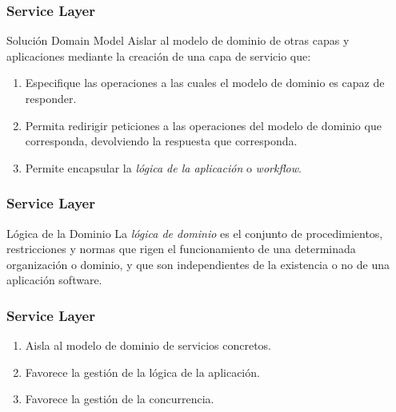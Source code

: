 \documentclass[handout,a4paper,slidestop,xcolor=pst,blue]{beamer}
\begin{document}
\begin{frame}[c]
    \frametitle{Service Layer}
    \begin{block}{Solución Domain Model}
        Aislar al modelo de dominio de otras capas y aplicaciones mediante la creación de una capa de servicio que:
        \begin{enumerate}
            \item Especifique las operaciones a las cuales el modelo de dominio es capaz de responder.
            \item Permita redirigir peticiones a las operaciones del modelo de dominio que corresponda, devolviendo la respuesta que corresponda.
            \item Permite encapsular la \emph{lógica de la aplicación} o \emph{workflow}.
        \end{enumerate}
    \end{block}
\end{frame}

\begin{frame}[c]
    \frametitle{Service Layer}
    \begin{block}{Lógica de la Dominio}
        La \emph{lógica de dominio} es el conjunto de procedimientos, restricciones y normas que rigen el funcionamiento de una determinada organización o dominio, y que son independientes de la existencia o no de una aplicación software.
    \end{block}
\end{frame}

\begin{frame}[c]
    \frametitle{Service Layer}
    \begin{enumerate}
        \item<1-> Aisla al modelo de dominio de servicios concretos.
        \item<2-> Favorece la gestión de la lógica de la aplicación.
        \item<3-> Favorece la gestión de la concurrencia.
    \end{enumerate}
\end{frame}
\end{document}
